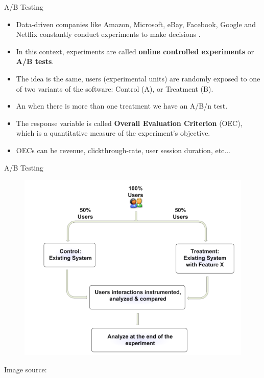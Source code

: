 \documentclass[handout]{beamer}
\begin{document}
\begin{frame}{A/B Testing}
\scriptsize{


\begin{itemize}

\item Data-driven companies like Amazon, Microsoft, eBay, Facebook, Google and Netflix constantly conduct experiments to make decisions \cite{kohavi2012trustworthy}.

\item In this context, experiments are called \textbf{online  controlled experiments} or \textbf{A/B tests}. 
 

 \item The idea is the same, users (experimental units) are randomly exposed to one of two variants of the software: Control (A), or Treatment (B).
 
 \item An when there is more than one treatment we have an A/B/n test.
 
 \item The response variable is called \textbf{Overall  Evaluation  Criterion} (OEC), which is a quantitative measure of the experiment's objective. 
 
 \item OECs can be revenue, clickthrough-rate, user session duration, etc...
 \end{itemize}

} 
\end{frame}


\begin{frame}{A/B Testing}

 \begin{figure}[h!]
	\centering
	\includegraphics[scale=0.34]{pics/abtest.png}
\end{figure}
Image source: \cite{kohavi2012trustworthy} 
\end{frame}
\end{document}
